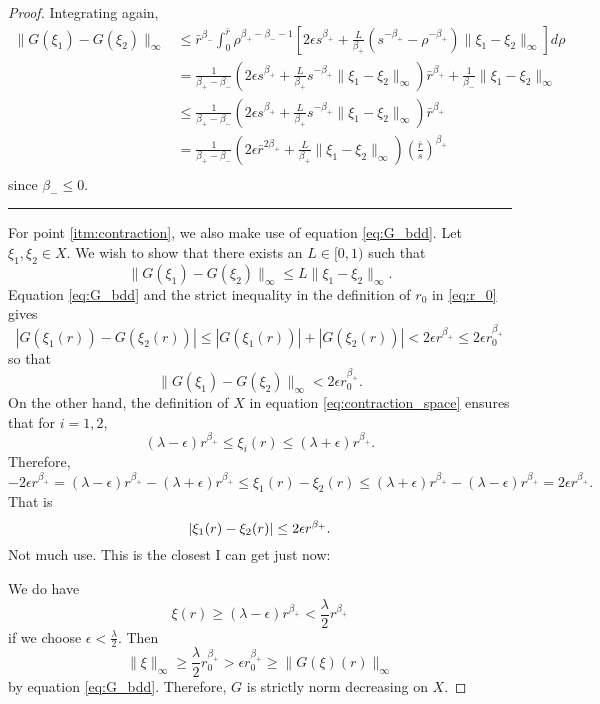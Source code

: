 \documentclass{amsart}
\begin{document}
\begin{proof}
Integrating again,
\[
\begin{split}
\|G(\xi_1) - G(\xi_2)\|_{\infty} &\leq \bar{r}^{\beta_-} \int_0^{\bar{r}} \rho^{\beta_+ - \beta_- - 1} \left[2\epsilon s^{\beta_+} + \frac{L}{\beta_+}(s^{-\beta_+} - \rho^{-\beta_+}) \|\xi_1 - \xi_2\|_{\infty} \right] d\rho \\
&= \frac{1}{\beta_+ - \beta_-} \left(2\epsilon s^{\beta_+} + \frac{L}{\beta_+} s^{-\beta_+} \|\xi_1 - \xi_2\|_{\infty}\right) \bar{r}^{\beta_+}  + \frac{1}{\beta_-} \|\xi_1 - \xi_2\|_{\infty} \\
&\leq \frac{1}{\beta_+ - \beta_-} \left(2\epsilon s^{\beta_+} + \frac{L}{\beta_+} s^{-\beta_+} \|\xi_1 - \xi_2\|_{\infty}\right) \bar{r}^{\beta_+} \\
&= \frac{1}{\beta_+ - \beta_-} \left(2\epsilon \bar{r}^{2\beta_+} + \frac{L}{\beta_+} \|\xi_1 - \xi_2\|_{\infty}\right) \left(\frac{\bar{r}}{s}\right)^{\beta_+} \\
\end{split}
\]
since \(\beta_- \leq 0\).


\hrule

For point \ref{itm:contraction}, we also make use of equation \eqref{eq:G_bdd}. Let \(\xi_1, \xi_2 \in X\). We wish to show that there exists an \(L \in [0, 1)\) such that
\[
\|G(\xi_1) - G(\xi_2)\|_{\infty} \leq L\|\xi_1 - \xi_2\|_{\infty}.
\]
Equation \eqref{eq:G_bdd} and the strict inequality in the definition of \(r_0\) in \eqref{eq:r_0} gives
\[
|G(\xi_1(r)) - G(\xi_2(r))| \leq |G(\xi_1(r))| + |G(\xi_2(r))| < 2\epsilon r^{\beta_+} \leq 2 \epsilon r_0^{\beta_+}
\]
so that
\[
\|G(\xi_1) - G(\xi_2)\|_{\infty} < 2 \epsilon r_0^{\beta_+}.
\]
On the other hand, the definition of \(X\) in equation \eqref{eq:contraction_space} ensures that for \(i = 1,2\),
\[
(\lambda - \epsilon) r^{\beta_+} \leq \xi_i(r) \leq (\lambda + \epsilon) r^{\beta_+}.
\]
Therefore,
\[
-2\epsilon r^{\beta_+} = (\lambda - \epsilon) r^{\beta_+} - (\lambda + \epsilon) r^{\beta_+} \leq \xi_1(r) - \xi_2(r) \leq (\lambda + \epsilon) r^{\beta_+} - (\lambda - \epsilon) r^{\beta_+} = 2 \epsilon r^{\beta_+}.
\]
That is
\[
\left|{\xi_1(r) - \xi_2(r)}\right| \leq 2\epsilon r^{\beta_+}.
\]
{\color{red} Not much use.}
{\color{red} This is the closest I can get just now:}

We do have
\[
\xi(r) \geq (\lambda - \epsilon) r^{\beta_+} < \frac{\lambda}{2} r^{\beta_+}
\]
if we choose \(\epsilon < \tfrac{\lambda}{2}\). Then
\[
\|\xi\|_{\infty} \geq \frac{\lambda}{2} r_0^{\beta_+} >  \epsilon r_0^{\beta_+} \geq \|G(\xi)(r)\|_{\infty}
\]
by equation \eqref{eq:G_bdd}. Therefore, \(G\) is strictly norm decreasing on \(X\).
\end{proof}
\end{document}
